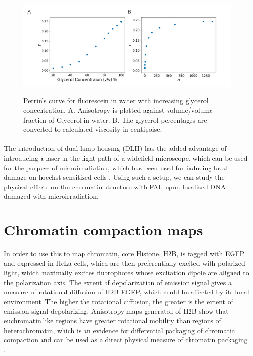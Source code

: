 \begin{figure}[!htp]
    {\hfill\includegraphics[clip,width=1\linewidth]{figures/perrin.png}\hspace*{\fill}}
    \caption{Perrin's curve for fluorescein in water with increasing glycerol concentration. A. Anisotropy is plotted against volume/volume fraction of Glycerol in water. B. The glycerol percentages are converted to calculated viscosity in centipoise.}
    {\label{fig:perrin}}
\end{figure}

\paragraph*{} The introduction of dual lamp housing (DLH) has the added advantage of introducing a laser in the light path of a widefield microscope, which can be used for the purpose of microirradiation, which has been used for inducing local damage on hoechst sensitized cells \cite{BURGESS20141703}. Using such a setup, we can study the physical effects on the chromatin structure with FAI, upon localized DNA damaged with microirradiation.

\section{Chromatin compaction maps}
\paragraph*{} In order to use this to map chromatin, core Histone, H2B, is tagged with EGFP and expressed in HeLa cells, which are then preferentially excited with polarized light, which maximally excites fluorophores whose excitation dipole are aligned to the polarization axis. The extent of depolarization of emission signal gives a measure of rotational diffusion of H2B-EGFP, which could be affected by its local environment. The higher the rotational diffusion, the greater is the extent of emission signal depolarizing. Anisotropy maps generated of H2B show that euchromatin like regions have greater rotational mobility than regions of heterochromatin, which is an evidence for differential packaging of chromatin compaction and can be used as a direct physical measure of chromatin packaging \cite{bhattacharya2009spatio}.

